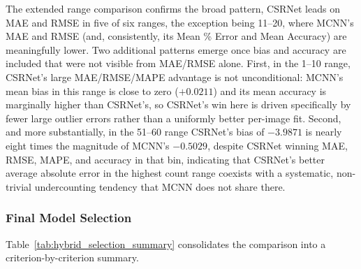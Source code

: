 \documentclass[12pt,a4paper]{report}
\begin{document}
The extended range comparison confirms the broad pattern, CSRNet leads on MAE and RMSE in five of six ranges, the exception being 11--20, where MCNN's MAE and RMSE (and, consistently, its Mean \% Error and Mean Accuracy) are meaningfully lower. Two additional patterns emerge once bias and accuracy are included that were not visible from MAE/RMSE alone. First, in the 1--10 range, CSRNet's large MAE/RMSE/MAPE advantage is not unconditional: MCNN's mean bias in this range is close to zero ($+0.0211$) and its mean accuracy is marginally higher than CSRNet's, so CSRNet's win here is driven specifically by fewer large outlier errors rather than a uniformly better per-image fit. Second, and more substantially, in the 51--60 range CSRNet's bias of $-3.9871$ is nearly eight times the magnitude of MCNN's $-0.5029$, despite CSRNet winning MAE, RMSE, MAPE, and accuracy in that bin, indicating that CSRNet's better average absolute error in the highest count range coexists with a systematic, non-trivial undercounting tendency that MCNN does not share there.

\subsubsection{Final Model Selection}

Table~\ref{tab:hybrid_selection_summary} consolidates the comparison into a criterion-by-criterion summary.
\end{document}
